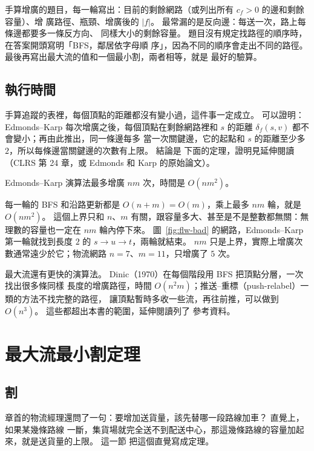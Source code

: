\begin{examnote}
手算增廣的題目，每一輪寫出：目前的剩餘網路（或列出所有 $c_f > 0$ 的邊和剩餘容量）、增
廣路徑、瓶頸、增廣後的 $|f|$。 最常漏的是反向邊：每送一次，路上每條邊都要多一條反方向、
同樣大小的剩餘容量。 題目沒有規定找路徑的順序時，在答案開頭寫明「BFS，鄰居依字母順
序」，因為不同的順序會走出不同的路徑。 最後再寫出最大流的值和一個最小割，兩者相等，就是
最好的驗算。
\end{examnote}

\subsection{執行時間}

手算追蹤的表裡，每個頂點的距離都沒有變小過，這件事一定成立。 可以證明：Edmonds--Karp
每次增廣之後，每個頂點在剩餘網路裡和 $s$ 的距離 $\delta_f(s, v)$ 都不會變小；再由此推出，同一條邊每多
當一次關鍵邊，它的起點和 $s$ 的距離至少多 $2$，所以每條邊當關鍵邊的次數有上限。 結論是
下面的定理，證明見延伸閱讀（CLRS 第 24 章，或 Edmonds 和 Karp 的原始論文）。

\begin{theorem}
\label{thm:flw-ek}
Edmonds--Karp 演算法最多增廣 $nm$ 次，時間是 $O(nm^2)$。
\end{theorem}

每一輪的 BFS 和沿路更新都是 $O(n + m) = O(m)$，乘上最多 $nm$ 輪，就是 $O(nm^2)$。
這個上界只和 $n$、$m$ 有關，跟容量多大、甚至是不是整數都無關：無理數的容量也一定在
$nm$ 輪內停下來。 圖~\ref{fig:flw-bad} 的網路，Edmonds--Karp 第一輪就找到長度 $2$ 的
$s \to u \to t$，兩輪就結束。 $nm$ 只是上界，實際上增廣次數通常遠少於它；物流網路
$n = 7$、$m = 11$，只增廣了 $5$ 次。

最大流還有更快的演算法。 Dinic（1970）在每個階段用 BFS 把頂點分層，一次找出很多條同樣
長度的增廣路徑，時間 $O(n^2 m)$；推送--重標（push-relabel）一類的方法不找完整的路徑，
讓頂點暫時多收一些流，再往前推，可以做到 $O(n^3)$。 這些都超出本書的範圍，延伸閱讀列了
參考資料。

\section{最大流最小割定理}
\label{sec:flw-mfmc}

\subsection{割}

章首的物流經理還問了一句：要增加送貨量，該先替哪一段路線加車？ 直覺上，如果某幾條路線
一斷，集貨場就完全送不到配送中心，那這幾條路線的容量加起來，就是送貨量的上限。 這一節
把這個直覺寫成定理。

